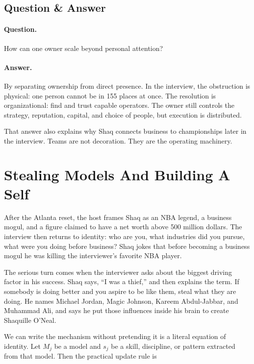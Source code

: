 \subsection{Question \& Answer}

\paragraph{Question.}
How can one owner scale beyond personal attention?

\paragraph{Answer.}
By separating ownership from direct presence. In the interview, the obstruction is physical: one person cannot be in 155 places at once. The resolution is organizational: find and trust capable operators. The owner still controls the strategy, reputation, capital, and choice of people, but execution is distributed.

That answer also explains why Shaq connects business to championships later in the interview. Teams are not decoration. They are the operating machinery.

\section{Stealing Models And Building A Self}

After the Atlanta reset, the host frames Shaq as an NBA legend, a business mogul, and a figure claimed to have a net worth above 500 million dollars. The interview then returns to identity: who are you, what industries did you pursue, what were you doing before business? Shaq jokes that before becoming a business mogul he was killing the interviewer's favorite NBA player.

The serious turn comes when the interviewer asks about the biggest driving factor in his success. Shaq says, ``I was a thief,'' and then explains the term. If somebody is doing better and you aspire to be like them, steal what they are doing. He names Michael Jordan, Magic Johnson, Kareem Abdul-Jabbar, and Muhammad Ali, and says he put those influences inside his brain to create Shaquille O'Neal.

We can write the mechanism without pretending it is a literal equation of identity. Let \(M_j\) be a model and \(s_j\) be a skill, discipline, or pattern extracted from that model. Then the practical update rule is

